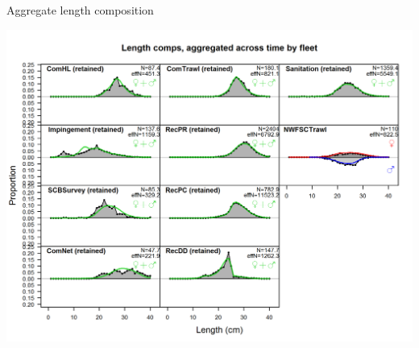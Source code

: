 \documentclass[ignorenonframetext,]{beamer}
\begin{document}
\begin{frame}{Aggregate length composition}

\includegraphics{r4ss/plots_mod1/comp_lenfit__aggregated_across_time.png}

\end{frame}
\end{document}
